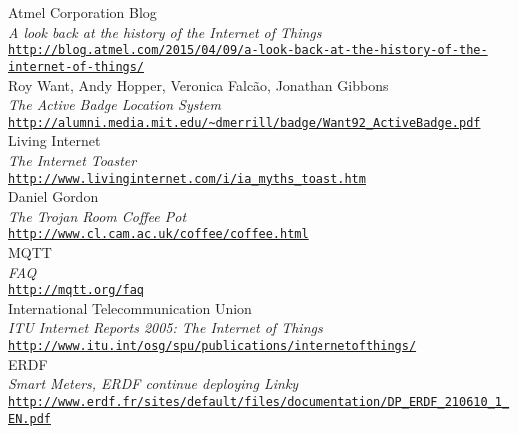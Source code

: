\cleardoublepage
{}
{}
\begin{thebibliography}{}

 Atmel Corporation Blog\\
  \emph{A look back at the history of the Internet of Things} \\
  \footnotesize \texttt{\url{http://blog.atmel.com/2015/04/09/a-look-back-at-the-history-of-the-internet-of-things/}} \\
  
 Roy Want, Andy Hopper, Veronica Falcão, Jonathan Gibbons\\
  \emph{The Active Badge Location System} \\
  \footnotesize \texttt{\url{http://alumni.media.mit.edu/~dmerrill/badge/Want92_ActiveBadge.pdf}} \\
  
 Living Internet\\
  \emph{The Internet Toaster} \\
  \footnotesize \texttt{\url{http://www.livinginternet.com/i/ia_myths_toast.htm}} \\
  
 Daniel Gordon\\
  \emph{The Trojan Room Coffee Pot} \\
  \footnotesize \texttt{\url{http://www.cl.cam.ac.uk/coffee/coffee.html}} \\
  
 MQTT\\
  \emph{FAQ} \\
  \footnotesize \texttt{\url{http://mqtt.org/faq}} \\
  
 International Telecommunication Union\\
  \emph{ITU Internet Reports 2005: The Internet of Things} \\
  \footnotesize \texttt{\url{http://www.itu.int/osg/spu/publications/internetofthings/}} \\
  
 ERDF\\
  \emph{Smart Meters, ERDF continue deploying Linky} \\
  \footnotesize \texttt{\url{http://www.erdf.fr/sites/default/files/documentation/DP_ERDF_210610_1_EN.pdf}} \\
  

\end{thebibliography}
